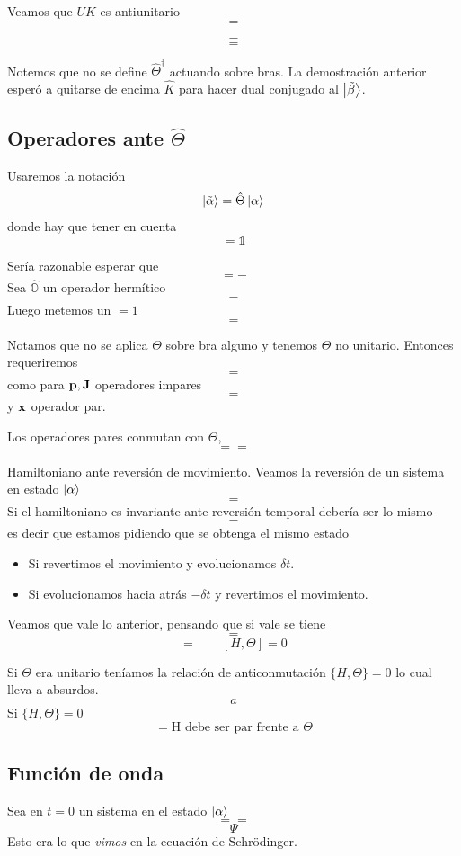 \documentclass[10pt,oneside]{CBFT_book}
\begin{document}
Veamos que $UK$ es antiunitario 
\[
	=
\]

\[
	=
\]
\[
	=
\]

Notemos que no se define $\hat{\Theta}^\dagger$ actuando sobre bras. La demostración anterior esperó a 
quitarse de encima $\hat{K}$ para hacer dual conjugado al $\Ket{\tilde{\beta}}$.

\subsection{Operadores ante $\hat{\Theta}$}

Usaremos la notación 
\[
	\Ket{\tilde{\alpha}} = \hat{\Theta} \Ket{\alpha}
\]
donde hay que tener en cuenta 
\[
	= \mathbb{1}
\]

Sería razonable esperar que 
\[
	= -
\]
Sea $\hat{\mathbb{O}}$ un operador hermítico 
\[
	=
\]
Luego metemos un $=1$
\[
	=
\]

Notamos que no se aplica $\Theta$ sobre bra alguno y tenemos $\Theta$ no unitario. Entonces requeriremos 
\[
	=
\]
como para $\vb{p},\vb{J}$ operadores impares 
\[
	=
\]
y $\vb{x}$ operador par.

Los operadores pares conmutan con $\Theta$,
\[
	= =
\]

Hamiltoniano ante reversión de movimiento. Veamos la reversión de un sistema en estado $\Ket{\alpha}$
\[
	=
\]
Si el hamiltoniano es invariante ante reversión temporal debería ser lo mismo 
\[
	=
\]
es decir que estamos pidiendo que se obtenga el mismo estado 
\begin{itemize}
 \item Si revertimos el movimiento y evolucionamos $\delta t$.
 \item Si evolucionamos hacia atrás $-\delta t$ y revertimos el movimiento.
\end{itemize}

Veamos que vale lo anterior, pensando que si vale se tiene 
\[
	=
\]
\[
	=  \qquad [H,\Theta]=0
\]

Si $\Theta$ era unitario teníamos la relación de anticonmutación $\{ H, \Theta \}=0$ lo cual lleva a absurdos.
\[
	a
\]
Si $\{ H,\Theta \} = 0$
\[
	= \text{H debe ser par frente a $\Theta$}
\]

\subsection{Función de onda}

Sea en $t=0$ un sistema en el estado $\Ket{\alpha}$
\[
	= = 
\]
\[
	\Psi
\]
Esto era lo que {\it vimos} en la ecuación de Schrödinger.
\end{document}
